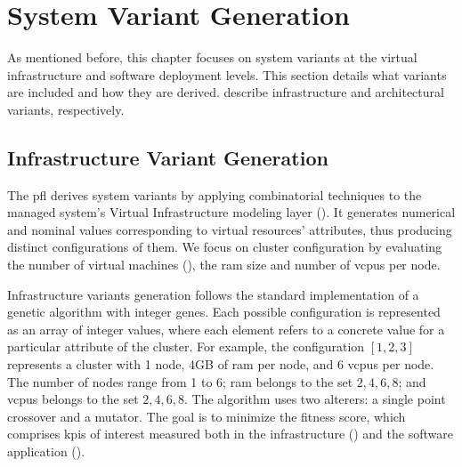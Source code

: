 \section{System Variant Generation}
\label{sect:architectural-framework--system-variant-generation}

As mentioned before, this chapter focuses on system variants at the virtual infrastructure and software deployment levels. This section details what variants are included and how they are derived.  describe infrastructure and architectural variants, respectively.

\subsection{Infrastructure Variant Generation}
\label{subsect:architectural-framework--infrastructure-variant-generation}

The \gls{pfl} derives system variants by applying combinatorial techniques to the managed system's Virtual Infrastructure modeling layer (). It generates numerical and nominal values corresponding to virtual resources' attributes, thus producing distinct configurations of them. We focus on cluster configuration by evaluating the number of virtual machines (), the \gls{ram} size and number of \glspl{vcpu} per node.

Infrastructure variants generation follows the standard implementation of a genetic algorithm with integer genes. Each possible configuration is represented as an array of integer values, where each element refers to a concrete value for a particular attribute of the cluster. For example, the configuration $[1, 2, 3]$ represents a cluster with 1 node, 4GB of \gls{ram} per node, and 6 \glspl{vcpu} per node. The number of nodes range from 1 to 6; \gls{ram} belongs to the set ${2, 4, 6, 8}$; and \glspl{vcpu} belongs to the set ${2, 4, 6, 8}$. The algorithm uses two alterers: a single point crossover and a mutator. The goal is to minimize the fitness score, which comprises \glspl{kpi} of interest measured both in the infrastructure () and the software application ().

